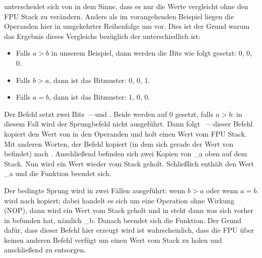 


\FCOM unterscheidet sich von \FCOMP in dem Sinne, dass es nur die Werte vergleicht ohne den FPU Stack zu verändern. 
Anders als im vorangehenden Beispiel liegen die Operanden hier in umgekehrter Reihenfolge um vor. Dies ist der Grund
warum das Ergebnis dieses Vergleichs bezüglich der \CThreeBits unterschiedlich ist:

\begin{itemize}
\item Falls $a>b$ in unserem Beispiel, dann werden die \CThreeBits Bits wie folgt gesetzt: 0, 0, 0.
\item Falls $b>a$, dann ist das Bitmuster: 0, 0, 1.
\item Falls $a=b$, dann ist das Bitmuster: 1, 0, 0.
\end{itemize}
Der Befehl  setzt zwei Bits~---\Cthree und \Czero. 
Beide werden auf 0 gesetzt, falls $a>b$: in diesem Fall wird der \JNE Sprungbefehl nicht ausgeführt.
Dann folgt ~---dieser Befehl kopiert den Wert von  in den Operanden und holt einen Wert vom FPU
Stack.
Mit anderen Worten, der Befehl kopiert  (in dem sich gerade der Wert von  befindet) nach . 
Anschließend befinden sich zwei Kopien von {\_a} oben auf dem Stack.
Nun wird ein Wert wieder vom Stack geholt. Schließlich enthält  den Wert {\_a} und die Funktion beendet sich.

Der bedingte Sprung \JNE wird in zwei Fällen ausgeführt: wenn $b>a$ oder wenn $a=b$.
 wird nach  kopiert; dabei handelt es sich um eine Operation ohne Wirkung (\ac{NOP}), dann wird ein Wert
 vom Stack geholt und in  steht dann was sich vorher in  befunden hat, nämlich {\_b}. Danach beendet sich
 die Funktion.
Der Grund dafür, dass dieser Befehl hier erzeugt wird ist wahrscheinlich, dass die \ac{FPU} über keinen anderen Befehl
verfügt um einen Wert vom Stack zu holen und anschließend zu entsorgen.


